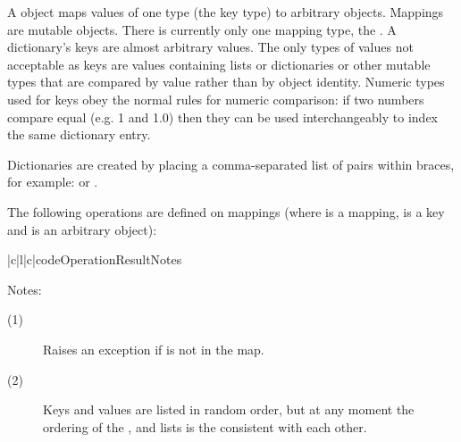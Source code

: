 A  object maps values of one type (the key type) to
arbitrary objects.  Mappings are mutable objects.  There is currently
only one mapping type, the .  A dictionary's keys are
almost arbitrary values.  The only types of values not acceptable as
keys are values containing lists or dictionaries or other mutable
types that are compared by value rather than by object identity.
Numeric types used for keys obey the normal rules for numeric
comparison: if two numbers compare equal (e.g. 1 and 1.0) then they
can be used interchangeably to index the same dictionary entry.


Dictionaries are created by placing a comma-separated list of
 pairs within braces, for example:
 or
.

The following operations are defined on mappings (where  is a
mapping,  is a key and  is an arbitrary object):

\begin{tableiii}{|c|l|c|}{code}{Operation}{Result}{Notes}
\end{tableiii}
\renewcommand{\indexsubitem}{(dictionary method)}

\noindent
Notes:
\begin{description}
\item[(1)] Raises an exception if  is not in the map.

\item[(2)] Keys and values are listed in random order, but at any
moment the ordering of the ,  and
 lists is the consistent with each other.
\end{description}

